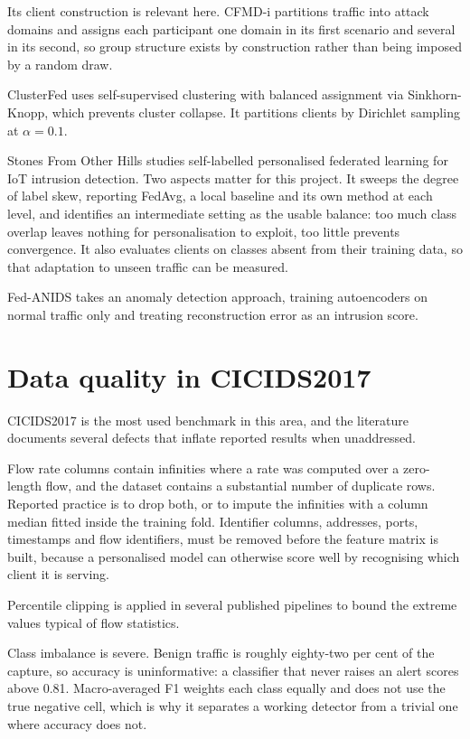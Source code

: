 Its client construction is relevant here. CFMD-i partitions traffic into attack
domains and assigns each participant one domain in its first scenario and
several in its second, so group structure exists by construction rather than
being imposed by a random draw.

ClusterFed \parencite{clusterfed-2025} uses self-supervised clustering with
balanced assignment via Sinkhorn-Knopp, which prevents cluster collapse. It
partitions clients by Dirichlet sampling at $\alpha = 0.1$.

Stones From Other Hills \parencite{soh-2025} studies self-labelled personalised
federated learning for IoT intrusion detection. Two aspects matter for this
project. It sweeps the degree of label skew, reporting FedAvg, a local baseline
and its own method at each level, and identifies an intermediate setting as the
usable balance: too much class overlap leaves nothing for personalisation to
exploit, too little prevents convergence. It also evaluates clients on classes
absent from their training data, so that adaptation to unseen traffic can be
measured.

Fed-ANIDS \parencite{fedanids-2023} takes an anomaly detection approach,
training autoencoders on normal traffic only and treating reconstruction error
as an intrusion score.

\section{Data quality in CICIDS2017}
\label{sec:data-quality}

CICIDS2017 \parencite{sharafaldin-2018} is the most used benchmark in this
area, and the literature documents several defects that inflate reported
results when unaddressed.

Flow rate columns contain infinities where a rate was computed over a
zero-length flow, and the dataset contains a substantial number of duplicate
rows. Reported practice is to drop both, or to impute the infinities with a
column median fitted inside the training fold. Identifier columns, addresses,
ports, timestamps and flow identifiers, must be removed before the feature
matrix is built, because a personalised model can otherwise score well by
recognising which client it is serving.

Percentile clipping is applied in several published pipelines to bound the
extreme values typical of flow statistics.

Class imbalance is severe. Benign traffic is roughly eighty-two per cent of the
capture, so accuracy is uninformative: a classifier that never raises an alert
scores above 0.81. Macro-averaged F1 weights each class equally and does not
use the true negative cell, which is why it separates a working detector from a
trivial one where accuracy does not.

